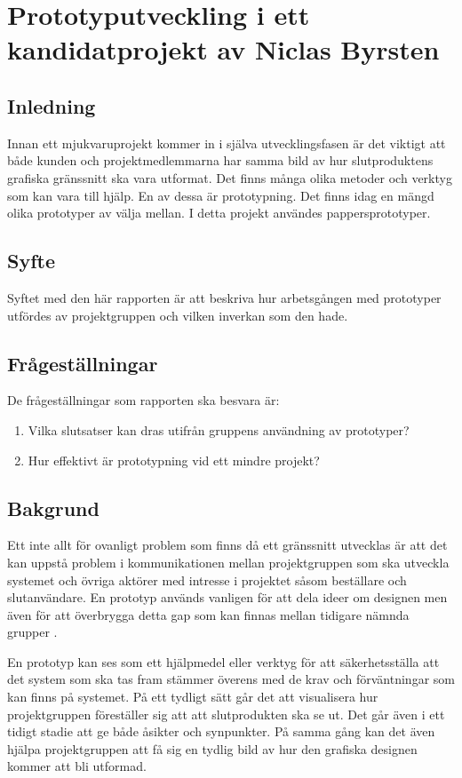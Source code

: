 \chapter{Prototyputveckling i ett kandidatprojekt av Niclas Byrsten}\label{appendix:prototyp}

\section{Inledning}
Innan ett mjukvaruprojekt kommer in i själva utvecklingsfasen är det viktigt att både kunden och projektmedlemmarna har 
samma bild av hur slutproduktens grafiska gränssnitt ska vara utformat. Det finns många olika metoder och verktyg som kan 
vara till hjälp. En av dessa är prototypning. Det finns idag en mängd olika prototyper av välja mellan. I detta projekt 
användes pappersprototyper.  

\section{Syfte}
Syftet med den här rapporten är att beskriva hur arbetsgången med prototyper utfördes av projektgruppen och vilken 
inverkan som den hade.
\section{Frågeställningar}
De frågeställningar som rapporten ska besvara är:
\begin{enumerate}
    \item Vilka slutsatser kan dras utifrån gruppens användning av prototyper? 
    \item Hur effektivt är prototypning vid ett mindre projekt?
\end{enumerate}

\section{Bakgrund}
Ett inte allt för ovanligt problem som finns då ett gränssnitt utvecklas är att det kan uppstå problem i kommunikationen 
mellan projektgruppen som ska utveckla systemet och övriga aktörer med intresse i projektet såsom beställare och 
slutanvändare. En prototyp används vanligen för att dela ideer om designen men även för att överbrygga detta gap som kan 
finnas mellan tidigare nämnda grupper \cite{caseStudy}. 

En prototyp kan ses som ett hjälpmedel eller verktyg för att säkerhetsställa att det system som ska tas fram stämmer 
överens med de krav och förväntningar som kan finns på systemet. På ett tydligt sätt går det att visualisera hur 
projektgruppen föreställer sig att att slutprodukten ska se ut. Det går även i ett tidigt stadie att ge både åsikter och 
synpunkter. På samma gång kan det även hjälpa projektgruppen att få sig en tydlig bild av hur den grafiska designen kommer 
att bli utformad. 

